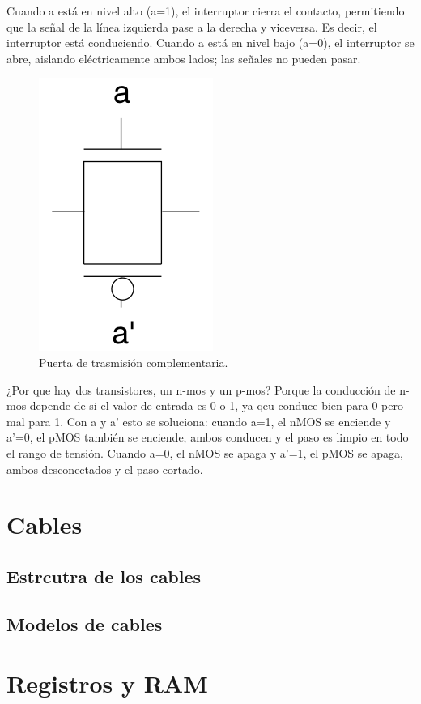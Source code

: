 Cuando a está en nivel alto (a=1), el interruptor cierra el contacto, permitiendo que la señal de la línea izquierda pase a la derecha y viceversa. Es decir, el interruptor está conduciendo. Cuando a está en nivel bajo (a=0), el interruptor se abre, aislando eléctricamente ambos lados; las señales no pueden pasar.

\begin{figure}[H] \centering
    \includegraphics[width=0.3\linewidth]{Imagenes/02/02-Switch}
    \caption{Puerta de trasmisión complementaria.}
    \label{Fig:02-switch}
\end{figure}

¿Por  que hay dos transistores, un n-mos y un p-mos? Porque la conducción de n-mos depende de si el valor de entrada es 0 o 1, ya qeu conduce bien para 0 pero mal para 1. Con a y a' esto se soluciona: cuando a=1, el nMOS se enciende y a'=0, el pMOS también se enciende, ambos conducen y el paso es limpio en todo el rango de tensión. Cuando a=0, el nMOS se apaga y a'=1, el pMOS se apaga, ambos desconectados y el paso cortado.

\section{Cables}

\subsection{Estrcutra de los cables}

\subsection{Modelos de cables}


\section{Registros y RAM}

